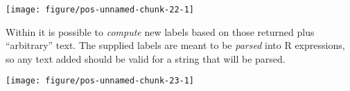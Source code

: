 \documentclass[paper=a4,10pt,div=17,headsepline,BCOR=12mm,twoside,open=right]{scrbook}\usepackage{knitr}
\begin{document}
\begin{knitrout}\footnotesize
{}\color{fgcolor}\begin{kframe}
\begin{alltt}
 \hlkwb{<-}  \hlopt{~}  \hlstd{,}  \hlstd{=} \hlstd{)}
  \hlopt{+}
  \hlstd{()} \hlopt{+}
  \hlstd{(} \hlstd{=} \hlstd{,}   \hlopt{+}
  \hlstd{(}\hlstd{(} 
                  \hlstd{=} \hlstd{)}
\end{alltt}
\end{kframe}

{\centering \texttt{[image: figure/pos-unnamed-chunk-22-1]} 

}



\end{knitrout}

Within  it is possible to \textit{compute} new labels based on those returned plus ``arbitrary'' text. The supplied labels are meant to be \textit{parsed} into R expressions, so any text added should be valid for a string that will be parsed.

\begin{knitrout}\footnotesize
{}\color{fgcolor}\begin{kframe}
\begin{alltt}
 \hlkwb{<-}  \hlopt{~}  \hlstd{,}  \hlstd{=} \hlstd{)}
  \hlopt{+}
  \hlstd{()} \hlopt{+}
  \hlstd{(} \hlstd{=} \hlstd{,}   \hlopt{+}
  \hlstd{(}\hlstd{(} \hlstd{=} 
                                  \hlstd{=} \hlstd{)),}
                  \hlstd{=} \hlstd{)}
\end{alltt}
\end{kframe}

{\centering \texttt{[image: figure/pos-unnamed-chunk-23-1]} 

}



\end{knitrout}
\end{document}
